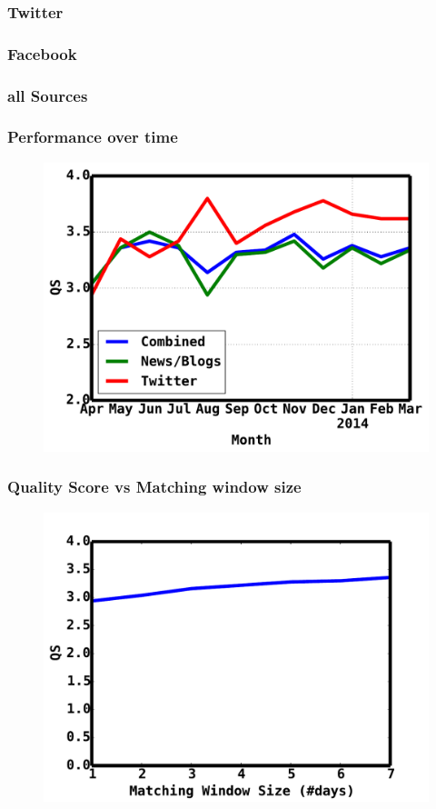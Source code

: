 \documentclass{beamer}
\begin{document}
\begin{frame}
    \frametitle{Twitter}
\end{frame}

\begin{frame}
    \frametitle{Facebook}
\end{frame}

\begin{frame}
    \frametitle{all Sources}
\end{frame}

\begin{frame}
    \frametitle{Performance over time}
    \begin{figure}
        \includegraphics[scale=0.4]{monthlyqs}
    \end{figure}
\end{frame}

\begin{frame}
    \frametitle{Quality Score vs Matching window size}
    \begin{figure}
        \includegraphics[scale=0.4]{matchingwindow}
    \end{figure}
\end{frame}
\end{document}

